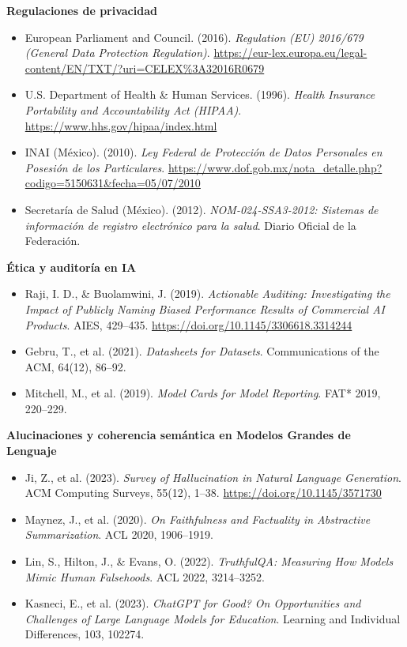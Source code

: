 \documentclass[12pt,a4paper]{report}
\numberwithin{figure}{section}
\begin{document}
\textbf{Regulaciones de privacidad}
\begin{itemize}
  \item European Parliament and Council. (2016). \textit{Regulation (EU) 2016/679 (General Data Protection Regulation)}. \url{https://eur-lex.europa.eu/legal-content/EN/TXT/?uri=CELEX%3A32016R0679}
  \item U.S. Department of Health \& Human Services. (1996). \textit{Health Insurance Portability and Accountability Act (HIPAA)}. \url{https://www.hhs.gov/hipaa/index.html}
  \item INAI (México). (2010). \textit{Ley Federal de Protección de Datos Personales en Posesión de los Particulares}. \url{https://www.dof.gob.mx/nota_detalle.php?codigo=5150631&fecha=05/07/2010}
  \item Secretaría de Salud (México). (2012). \textit{NOM-024-SSA3-2012: Sistemas de información de registro electrónico para la salud}. Diario Oficial de la Federación.
\end{itemize}

\textbf{Ética y auditoría en IA}
\begin{itemize}
  \item Raji, I. D., \& Buolamwini, J. (2019). \textit{Actionable Auditing: Investigating the Impact of Publicly Naming Biased Performance Results of Commercial AI Products}. AIES, 429–435. \url{https://doi.org/10.1145/3306618.3314244}
  \item Gebru, T., et al. (2021). \textit{Datasheets for Datasets}. Communications of the ACM, 64(12), 86–92.
  \item Mitchell, M., et al. (2019). \textit{Model Cards for Model Reporting}. FAT* 2019, 220–229.
\end{itemize}

\textbf{Alucinaciones y coherencia semántica en Modelos Grandes de Lenguaje}
\begin{itemize}
  \item Ji, Z., et al. (2023). \textit{Survey of Hallucination in Natural Language Generation}. ACM Computing Surveys, 55(12), 1–38. \url{https://doi.org/10.1145/3571730}
  \item Maynez, J., et al. (2020). \textit{On Faithfulness and Factuality in Abstractive Summarization}. ACL 2020, 1906–1919.
  \item Lin, S., Hilton, J., \& Evans, O. (2022). \textit{TruthfulQA: Measuring How Models Mimic Human Falsehoods}. ACL 2022, 3214–3252.
  \item Kasneci, E., et al. (2023). \textit{ChatGPT for Good? On Opportunities and Challenges of Large Language Models for Education}. Learning and Individual Differences, 103, 102274.
\end{itemize}
\end{document}
